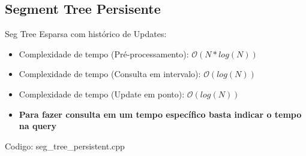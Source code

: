 \documentclass[10pt, a4paper, oneside]{book}
\begin{document}
\subsection{Segment Tree Persisente}


Seg Tree Esparsa com histórico de Updates:



\begin{itemize}
\item Complexidade de tempo (Pré-processamento): $\mathcal{O}(N *log(N))$
\item Complexidade de tempo (Consulta em intervalo): $\mathcal{O}(log(N))$
\item Complexidade de tempo (Update em ponto): $\mathcal{O}(log(N))$
\end{itemize}



\begin{itemize}
\item \textbf{Para fazer consulta em um tempo específico basta indicar o tempo na query}
\end{itemize}

\hfill

Codigo: seg\_tree\_persistent.cpp
\end{document}
